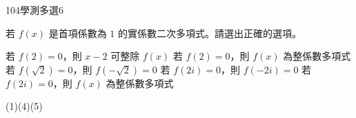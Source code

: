     \begin{QUESTION}
        \begin{ExamInfo}{104}{學測}{多選}{6}
        \end{ExamInfo}
        \begin{ExamAnsRateInfo}{45}{74}{43}{18}
        \end{ExamAnsRateInfo}
        \begin{QBODY}
            若 $f\left( x \right)$ 是首項係數為 $1$ 的實係數二次多項式。請選出正確的選項。
			\begin{QOPS}
				\QOP 若 $f\left( 2 \right)=0$，則 $x-2$ 可整除 $f\left( x \right)$
				\QOP 若 $f\left( 2 \right)=0$，則 $f\left( x \right)$ 為整係數多項式
				\QOP 若 $f\left( \sqrt{2} \right)=0$，則 $f\left( -\sqrt{2} \right)=0$
				\QOP 若 $f\left( 2i \right)=0$，則 $f\left( -2i \right)=0$
				\QOP 若 $f\left( 2i \right)=0$，則 $f\left( x \right)$ 為整係數多項式
			\end{QOPS}
        \end{QBODY}
        \begin{QFROMS}
        \end{QFROMS}
        \begin{QTAGS}\end{QTAGS}
        \begin{QANS}
            (1)(4)(5)
        \end{QANS}
        \begin{QSOLLIST}
        \end{QSOLLIST}
        \begin{QEMPTYSPACE}
        \end{QEMPTYSPACE}
    \end{QUESTION}

